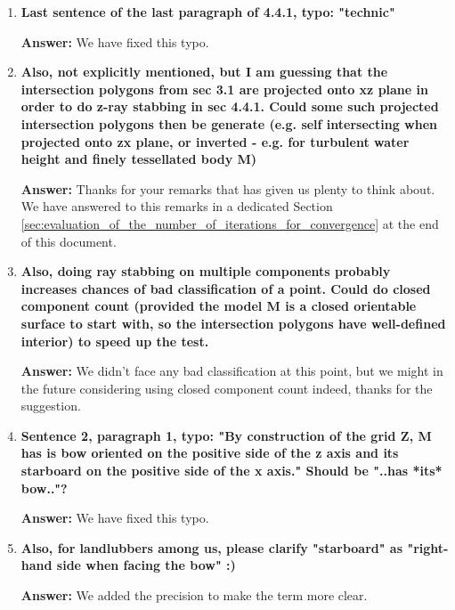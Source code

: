 \documentclass{article}
\newcommand{\answer}[1]{\textbf{\textcolor{answercolor}{Answer:}} \textcolor{answercolor}{#1}}
\begin{document}
\begin{enumerate}[label=\textbf{\arabic*.}]
	      \answer{TODO what robustness issues and instability ?}

	\item \textbf{Last sentence of the last paragraph of 4.4.1, typo: "technic"}

	      \answer{We have fixed this typo.}

	\item \textbf{Also, not explicitly mentioned, but I am guessing that the intersection polygons from sec 3.1 are projected onto xz plane in order to do z-ray stabbing in sec 4.4.1. Could some such projected intersection polygons then be generate (e.g. self intersecting when projected onto zx plane, or inverted - e.g. for turbulent water height and finely tessellated body M)}

	      \answer{Thanks for your remarks that has given us plenty to think about. We have answered to this remarks in a dedicated Section \ref{sec:evaluation_of_the_number_of_iterations_for_convergence} at the end of this document.}


	\item \textbf{Also, doing ray stabbing on multiple components probably increases chances of bad classification of a point. Could do closed component count (provided the model M is a closed orientable surface to start with, so the intersection polygons have well-defined interior) to speed up the test.}

	      \answer{We didn't face any bad classification at this point, but we might in the future considering using closed component count indeed, thanks for the suggestion.}

	\item \textbf{Sentence 2, paragraph 1, typo: "By construction of the grid Z, M has is bow oriented on the positive side of the z axis and its starboard on the positive side of the x axis." Should be "..has *its* bow.."?}

	      \answer{We have fixed this typo.}


	\item \textbf{Also, for landlubbers among us, please clarify "starboard" as "right-hand side when facing the bow" :)}

	      \answer{We added the precision to make the term more clear.}



\end{enumerate}
\end{document}
